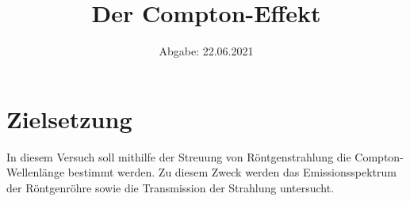 

\subject{D603}
\title{Der Compton-Effekt}
\date{
    Abgabe: 22.06.2021
}



\maketitle
\thispagestyle{empty}
\tableofcontents
\newpage

\section{Zielsetzung}

    In diesem Versuch soll mithilfe der Streuung von Röntgenstrahlung die Compton-Wellenlänge bestimmt werden.
    Zu diesem Zweck werden das Emissionsspektrum der Röntgenröhre
    sowie die Transmission der Strahlung untersucht.


\clearpage


\clearpage


\clearpage


\clearpage


\clearpage

\printbibliography


